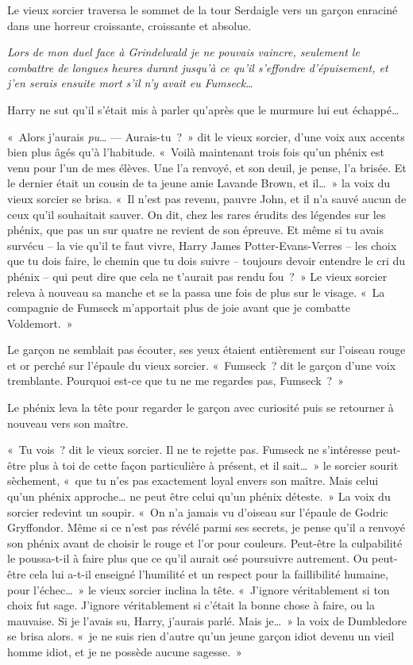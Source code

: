 Le vieux sorcier traversa le sommet de la tour Serdaigle vers un garçon enraciné dans une horreur croissante, croissante et absolue.

\emph{Lors de mon duel face à Grindelwald je ne pouvais vaincre, seulement le combattre de longues heures durant jusqu'à ce qu'il s'effondre d'épuisement, et j'en serais ensuite mort s'il n'y avait eu Fumseck…}

Harry ne sut qu'il s'était mis à parler qu'après que le murmure lui eut échappé…

«~Alors j'aurais \emph{pu}…
---  Aurais-tu~?~»
dit le vieux sorcier, d'une voix aux accents bien plus âgés qu'à l'habitude.
«~Voilà maintenant trois fois qu'un phénix est venu pour l'un de mes élèves.
Une l'a renvoyé, et son deuil, je pense, l'a brisée.
Et le dernier était un cousin de ta jeune amie Lavande Brown, et il…~»
la voix du vieux sorcier se brisa.
«~Il n'est pas revenu, pauvre John, et il n'a sauvé aucun de ceux qu'il souhaitait sauver.
On dit, chez les rares érudits des légendes sur les phénix, que pas un sur quatre ne revient de son épreuve.
Et même si tu avais survécu -- la vie qu'il te faut vivre, Harry James Potter-Evans-Verres -- les choix que tu dois faire, le chemin que tu dois suivre -- toujours devoir entendre le cri du phénix -- qui peut dire que cela ne t'aurait pas rendu fou~?~»
Le vieux sorcier releva à nouveau sa manche et se la passa une fois de plus sur le visage.
«~La compagnie de Fumseck m'apportait plus de joie avant que je combatte Voldemort.~»

Le garçon ne semblait pas écouter, ses yeux étaient entièrement sur l'oiseau rouge et or perché sur l'épaule du vieux sorcier.
«~Fumseck~? dit le garçon d'une voix tremblante.
Pourquoi est-ce que tu ne me regardes pas, Fumseck~?~»

Le phénix leva la tête pour regarder le garçon avec curiosité puis se retourner à nouveau vers son maître.

«~Tu vois~? dit le vieux sorcier.
Il ne te rejette pas.
Fumseck ne s'intéresse peut-être plus à toi de cette façon particulière à présent, et il sait…~»
le sorcier sourit sèchement, «~que tu n'es pas exactement loyal envers son maître.
Mais celui qu'un phénix approche… ne peut être celui qu'un phénix déteste.~»
La voix du sorcier redevint un soupir.
«~On n'a jamais vu d'oiseau sur l'épaule de Godric Gryffondor.
Même si ce n'est pas révélé parmi ses secrets, je pense qu'il a renvoyé son phénix avant de choisir le rouge et l'or pour couleurs.
Peut-être la culpabilité le poussa-t-il à faire plus que ce qu'il aurait osé poursuivre autrement.
Ou peut-être cela lui a-t-il enseigné l'humilité et un respect pour la faillibilité humaine, pour l'échec…~»
le vieux sorcier inclina la tête.
«~J'ignore véritablement si ton choix fut sage.
J'ignore véritablement si c'était la bonne chose à faire, ou la mauvaise.
Si je l'avais su, Harry, j'aurais parlé.
Mais je…~»
la voix de Dumbledore se brisa alors.
«~je ne suis rien d'autre qu'un jeune garçon idiot devenu un vieil homme idiot, et je ne possède aucune sagesse.~»

